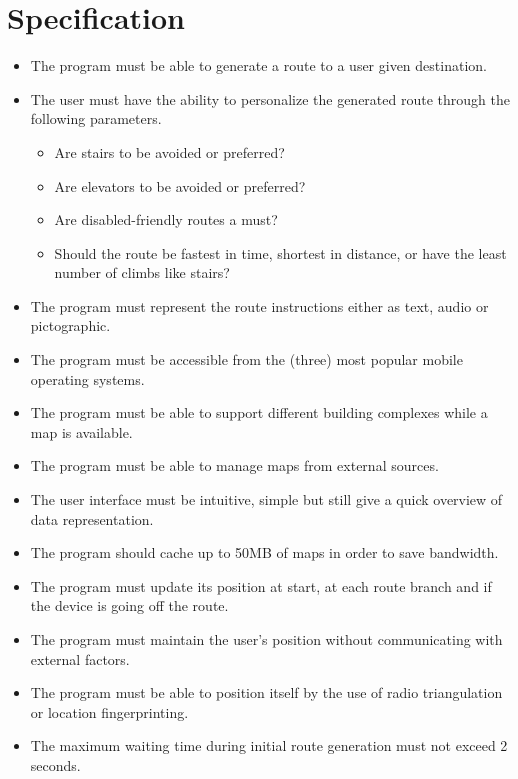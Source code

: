 \section{Specification} %
\label{sec:specification}


\begin{itemize}
	\item The program must be able to generate a route to a user given destination.
	\item The user must have the ability to personalize the generated route through the following parameters.
			\begin{itemize}
				\item Are stairs to be avoided or preferred?
				\item Are elevators to be avoided or preferred?
				\item Are disabled-friendly routes a must?
				\item Should the route be fastest in time, shortest in distance, or have the least number of climbs like stairs?
			\end{itemize}
	\item The program must represent the route instructions either as text, audio or pictographic.
	\item The program must be accessible from the (three) most popular mobile operating systems. 
	\item The program must be able to support different building complexes while a map is available.
	\item The program must be able to manage maps from external sources.
	\item The user interface must be intuitive, simple but still give a quick overview of data representation.
	\item The program should cache up to 50MB of maps in order to save bandwidth.
	\item The program must update its position at start, at each route branch and if the device is going off the route.
	\item The program must maintain the user's position without communicating with external factors.
	\item The program must be able to position itself by the use of radio triangulation or location fingerprinting.
	\item The maximum waiting time during initial route generation must not exceed 2 seconds.
\end{itemize}



